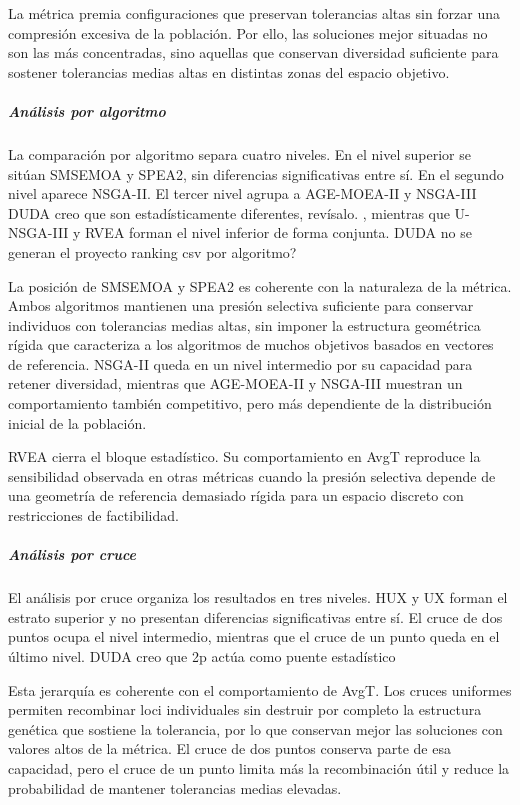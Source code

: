 La métrica premia configuraciones que preservan tolerancias altas sin forzar una compresión excesiva de la población. Por ello, las soluciones mejor situadas no son las más concentradas, sino aquellas que conservan diversidad suficiente para sostener tolerancias medias altas en distintas zonas del espacio objetivo.

\subparagraph{Análisis por algoritmo}

La comparación por algoritmo separa cuatro niveles. En el nivel superior se sitúan SMSEMOA y SPEA2, sin diferencias significativas entre sí. En el segundo nivel aparece NSGA-II. El tercer nivel agrupa a AGE-MOEA-II y NSGA-III DUDA creo que son estadísticamente diferentes, revísalo. , mientras que U-NSGA-III y RVEA forman el nivel inferior de forma conjunta. DUDA no se generan el proyecto ranking csv por algoritmo?

La posición de SMSEMOA y SPEA2 es coherente con la naturaleza de la métrica. Ambos algoritmos mantienen una presión selectiva suficiente para conservar individuos con tolerancias medias altas, sin imponer la estructura geométrica rígida que caracteriza a los algoritmos de muchos objetivos basados en vectores de referencia. NSGA-II queda en un nivel intermedio por su capacidad para retener diversidad, mientras que AGE-MOEA-II y NSGA-III muestran un comportamiento también competitivo, pero más dependiente de la distribución inicial de la población.

RVEA cierra el bloque estadístico. Su comportamiento en AvgT reproduce la sensibilidad observada en otras métricas cuando la presión selectiva depende de una geometría de referencia demasiado rígida para un espacio discreto con restricciones de factibilidad.

\subparagraph{Análisis por cruce}

El análisis por cruce organiza los resultados en tres niveles. HUX y UX forman el estrato superior y no presentan diferencias significativas entre sí. El cruce de dos puntos ocupa el nivel intermedio, mientras que el cruce de un punto queda en el último nivel. DUDA creo que 2p actúa como puente estadístico

Esta jerarquía es coherente con el comportamiento de AvgT. Los cruces uniformes permiten recombinar loci individuales sin destruir por completo la estructura genética que sostiene la tolerancia, por lo que conservan mejor las soluciones con valores altos de la métrica. El cruce de dos puntos conserva parte de esa capacidad, pero el cruce de un punto limita más la recombinación útil y reduce la probabilidad de mantener tolerancias medias elevadas.

